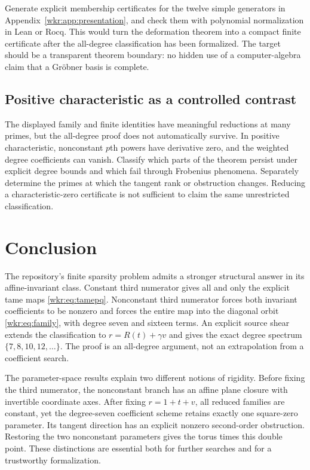 \documentclass[11pt,a4paper]{article}
\numberwithin{equation}{section}
\theoremstyle{definition}
\theoremstyle{remark}
\begin{document}
Generate explicit membership certificates for the twelve simple generators
in Appendix~\ref{wkr:app:presentation}, and check them with polynomial
normalization in Lean or Rocq. This would turn the deformation theorem into
a compact finite certificate after the all-degree classification has been
formalized. The target should be a transparent theorem boundary: no hidden
use of a computer-algebra claim that a Gr\"obner basis is complete.

\subsection{Positive characteristic as a controlled contrast}

The displayed family and finite identities have meaningful reductions at
many primes, but the all-degree proof does not automatically survive.
In positive characteristic, nonconstant $p$th powers have derivative zero,
and the weighted degree coefficients can vanish. Classify which parts of
the theorem persist under explicit degree bounds and which fail through
Frobenius phenomena. Separately determine the primes at which the tangent
rank or obstruction changes. Reducing a characteristic-zero certificate
is not sufficient to claim the same unrestricted classification.

\section{Conclusion}

The repository's finite sparsity problem admits a stronger structural
answer in its affine-invariant class. Constant third numerator gives all
and only the explicit tame maps \eqref{wkr:eq:tamepq}. Nonconstant third
numerator forces both invariant coefficients to be nonzero and forces the
entire map into the diagonal orbit \eqref{wkr:eq:family}, with degree seven and
sixteen terms. An explicit source shear extends the classification to
$r=R(t)+\gamma v$ and gives the exact degree spectrum
$\{7,8,10,12,\ldots\}$. The proof is an all-degree argument, not an
extrapolation from a coefficient search.

The parameter-space results explain two different notions of rigidity.
Before fixing the third numerator, the nonconstant branch has an affine
plane closure with invertible coordinate axes. After fixing $r=1+t+v$,
all reduced families are constant, yet the degree-seven coefficient scheme
retains exactly one square-zero parameter. Its tangent direction has an
explicit nonzero second-order obstruction. Restoring the two nonconstant
parameters gives the torus times this double point. These distinctions are essential
both for further searches and for a trustworthy formalization.
\end{document}
